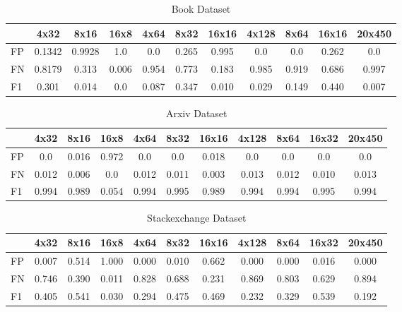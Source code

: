 \documentclass{article}
\begin{document}
\begin{table}[h]
\centering
\caption{Book Dataset}
\begin{tabular}{|l|c|c|c|c|c|c|c|c|c|c|}
\hline
     &4x32  & 8x16 & 16x8  & 4x64 & 8x32 & 16x16 & 4x128 & 8x64 & 16x16 & 20x450\\ \hline
FP & 0.1342    & 0.9928    & 1.0   & 0.0 & 0.265 & 0.995 & 0.0 & 0.0 & 0.262 & 0.0 \\ \hline
FN & 0.8179    & 0.313    & 0.006  & 0.954 & 0.773 & 0.183 & 0.985	& 0.919 & 0.686 & 0.997\\ \hline
F1 & 0.301    & 0.014    & 0.0   & 0.087 & 0.347 & 0.010 & 0.029 & 0.149 & 0.440 & 0.007\\ \hline
\end{tabular}
\end{table}

\begin{table}[h]
\centering
\caption{Arxiv Dataset}
\begin{tabular}{|l|c|c|c|c|c|c|c|c|c|c|}
\hline
     &4x32  & 8x16 & 16x8  & 4x64 & 8x32 & 16x16 & 4x128 & 8x64 & 16x32 & 20x450\\ \hline
FP & 0.0 & 0.016 & 0.972 & 0.0 & 0.0 & 0.018 & 0.0 & 0.0 & 0.0 & 0.0 \\ \hline
FN & 0.012 & 0.006 & 0.0 & 0.012 & 0.011 & 0.003 & 0.013 & 0.012 & 0.010 & 0.013 \\ \hline
F1 & 0.994 & 0.989 & 0.054 & 0.994 & 0.995 & 0.989 & 0.994 & 0.994 & 0.995 & 0.994 \\ \hline
\end{tabular}
\end{table}


\begin{table}[h]
\centering
\caption{Stackexchange Dataset}
\begin{tabular}{|l|c|c|c|c|c|c|c|c|c|c|}
\hline
     &4x32  & 8x16 & 16x8  & 4x64 & 8x32 & 16x16 & 4x128 & 8x64 & 16x32 & 20x450\\ \hline
FP & 0.007 & 0.514 & 1.000 & 0.000 & 0.010 & 0.662 & 0.000 & 0.000 & 0.016 & 0.000 \\ \hline
FN & 0.746 & 0.390 & 0.011 & 0.828 & 0.688 & 0.231 & 0.869 & 0.803 & 0.629 & 0.894 \\ \hline
F1 & 0.405 & 0.541 & 0.030 & 0.294 & 0.475 & 0.469 & 0.232 & 0.329 & 0.539 & 0.192 \\ \hline
\end{tabular}
\end{table}
\end{document}
